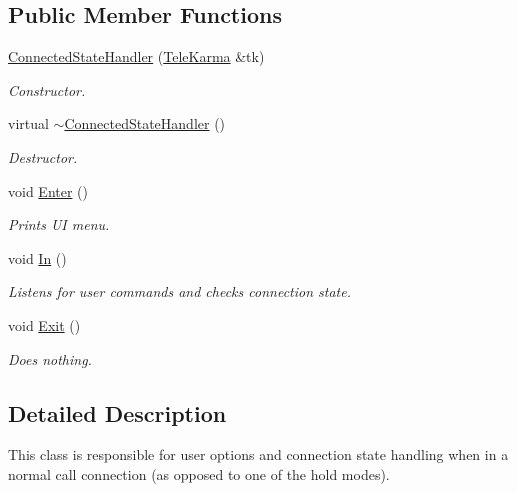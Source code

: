 \subsection*{Public Member Functions}
\begin{CompactItemize}
\item 
\hyperlink{classConnectedStateHandler_6f13492d7dfdb368376b4c5fb801b95f}{ConnectedStateHandler} (\hyperlink{classTeleKarma}{TeleKarma} \&tk)
\begin{CompactList}\small\item\em Constructor. \item\end{CompactList}\item 
virtual \hyperlink{classConnectedStateHandler_4e2a09e93f69af0a10196a4d3a188d5d}{$\sim$ConnectedStateHandler} ()
\begin{CompactList}\small\item\em Destructor. \item\end{CompactList}\item 
void \hyperlink{classConnectedStateHandler_3eb15025f62e77147d7e20590daabf3e}{Enter} ()
\begin{CompactList}\small\item\em Prints UI menu. \item\end{CompactList}\item 
void \hyperlink{classConnectedStateHandler_7a0669af69bd884c9c816e153ed2610c}{In} ()
\begin{CompactList}\small\item\em Listens for user commands and checks connection state. \item\end{CompactList}\item 
void \hyperlink{classConnectedStateHandler_f685982d68b383cf8f4e5f5c19dc419c}{Exit} ()
\begin{CompactList}\small\item\em Does nothing. \item\end{CompactList}\end{CompactItemize}


\subsection{Detailed Description}
This class is responsible for user options and connection state handling when in a normal call connection (as opposed to one of the hold modes). 

